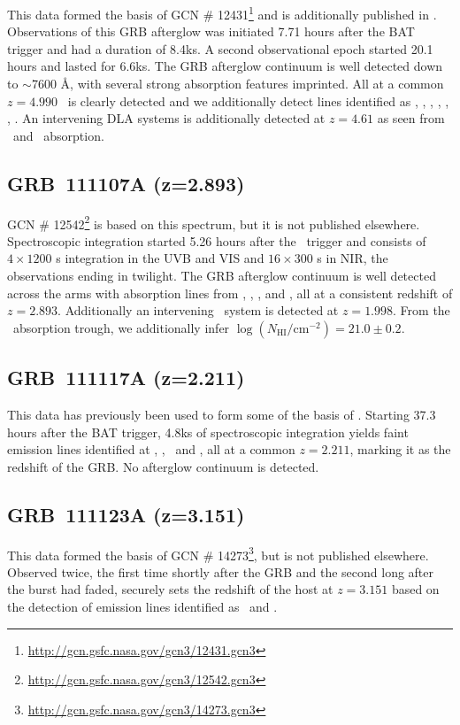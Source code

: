 \documentclass{aa}    %
\begin{document}
This data formed the basis of GCN \#
12431\footnote{\url{http://gcn.gsfc.nasa.gov/gcn3/12431.gcn3}} and is
additionally published in \citet{Sparre2014}. Observations of this GRB afterglow
was initiated 7.71 hours after the BAT trigger and had a duration of 8.4ks. A
second observational epoch started 20.1 hours and lasted for 6.6ks. The GRB
afterglow continuum is well detected down to $\sim$7600 \AA, with several strong
absorption features imprinted. All at a common $z = 4.990$ \lya~is clearly
detected and we additionally detect lines identified as \SIii, \feii, \civ,
\mgii, \SIii*, \sii*, \oi*. An intervening DLA systems is additionally detected
at  $z = 4.61$ as seen from \lya~and \mgii~absorption.

\subsection{GRB~111107A (z=2.893)}

GCN \# 12542\footnote{\url{http://gcn.gsfc.nasa.gov/gcn3/12542.gcn3}} is based
on this spectrum, but it is not published elsewhere. Spectroscopic integration
started 5.26 hours after the \swift~trigger and consists of $4 \times 1200$ s
integration in the UVB and VIS and $16 \times 300$ s in NIR, the observations
ending in twilight. The GRB afterglow continuum is well detected across the arms
with absorption lines from \lya, \civ, \feii, and \mgii, all at a consistent
redshift of $z = 2.893$. Additionally an intervening \mgii~system is detected at
$z = 1.998$. From the \lya~absorption trough, we additionally infer $\log
(N_{\mathrm{HI}}/\mathrm{cm}^{-2}) = 21.0 \pm 0.2$.

\subsection{GRB~111117A (z=2.211)}

This data has previously been used to form some of the basis of
\citet{Selsing2017}. Starting 37.3 hours after the BAT trigger, 4.8ks of
spectroscopic integration yields faint emission lines identified at \oii, \hb,
\oiii~and \ha, all at a common $z = 2.211$, marking it as the redshift of the
GRB. No afterglow continuum is detected.

\subsection{GRB~111123A  (z=3.151)}

This data formed the basis of GCN \#
14273\footnote{\url{http://gcn.gsfc.nasa.gov/gcn3/14273.gcn3}}, but is not
published elsewhere. Observed twice, the first time shortly after the GRB and
the second long after the burst had faded, securely sets the redshift of the
host at $z = 3.151$ based on the detection of emission lines identified as
\oii~and \oiii.
\end{document}
